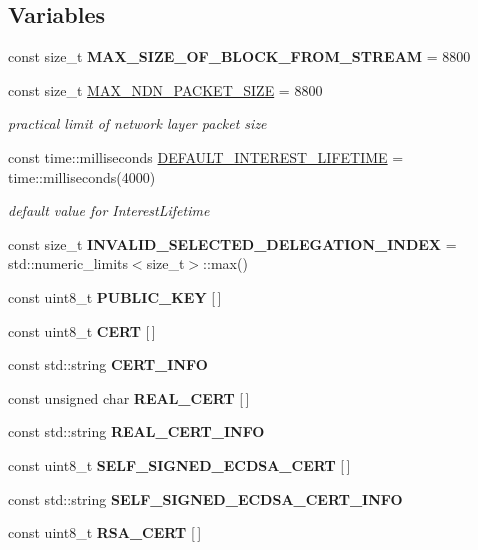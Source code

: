 \subsection*{Variables}
\begin{DoxyCompactItemize}
\item 
const size\+\_\+t {\bfseries M\+A\+X\+\_\+\+S\+I\+Z\+E\+\_\+\+O\+F\+\_\+\+B\+L\+O\+C\+K\+\_\+\+F\+R\+O\+M\+\_\+\+S\+T\+R\+E\+AM} = 8800\hypertarget{namespacendn_ab6b7f4ecd7d3cf13b51aa463d3fa7fb7}{}\label{namespacendn_ab6b7f4ecd7d3cf13b51aa463d3fa7fb7}

\item 
const size\+\_\+t \hyperlink{namespacendn_a8117ecf631e92bab09eb41b92ac9b2b6}{M\+A\+X\+\_\+\+N\+D\+N\+\_\+\+P\+A\+C\+K\+E\+T\+\_\+\+S\+I\+ZE} = 8800
\begin{DoxyCompactList}\small\item\em practical limit of network layer packet size \end{DoxyCompactList}\item 
const time\+::milliseconds \hyperlink{namespacendn_a63b98a0033d4c0cf18297688044a0258}{D\+E\+F\+A\+U\+L\+T\+\_\+\+I\+N\+T\+E\+R\+E\+S\+T\+\_\+\+L\+I\+F\+E\+T\+I\+ME} = time\+::milliseconds(4000)\hypertarget{namespacendn_a63b98a0033d4c0cf18297688044a0258}{}\label{namespacendn_a63b98a0033d4c0cf18297688044a0258}

\begin{DoxyCompactList}\small\item\em default value for Interest\+Lifetime \end{DoxyCompactList}\item 
const size\+\_\+t {\bfseries I\+N\+V\+A\+L\+I\+D\+\_\+\+S\+E\+L\+E\+C\+T\+E\+D\+\_\+\+D\+E\+L\+E\+G\+A\+T\+I\+O\+N\+\_\+\+I\+N\+D\+EX} = std\+::numeric\+\_\+limits$<$size\+\_\+t$>$\+::max()\hypertarget{namespacendn_a32e44e9d29558eb900f8e4cddfe70793}{}\label{namespacendn_a32e44e9d29558eb900f8e4cddfe70793}

\item 
const uint8\+\_\+t {\bfseries P\+U\+B\+L\+I\+C\+\_\+\+K\+EY} \mbox{[}$\,$\mbox{]}
\item 
const uint8\+\_\+t {\bfseries C\+E\+RT} \mbox{[}$\,$\mbox{]}
\item 
const std\+::string {\bfseries C\+E\+R\+T\+\_\+\+I\+N\+FO}
\item 
const unsigned char {\bfseries R\+E\+A\+L\+\_\+\+C\+E\+RT} \mbox{[}$\,$\mbox{]}
\item 
const std\+::string {\bfseries R\+E\+A\+L\+\_\+\+C\+E\+R\+T\+\_\+\+I\+N\+FO}
\item 
const uint8\+\_\+t {\bfseries S\+E\+L\+F\+\_\+\+S\+I\+G\+N\+E\+D\+\_\+\+E\+C\+D\+S\+A\+\_\+\+C\+E\+RT} \mbox{[}$\,$\mbox{]}
\item 
const std\+::string {\bfseries S\+E\+L\+F\+\_\+\+S\+I\+G\+N\+E\+D\+\_\+\+E\+C\+D\+S\+A\+\_\+\+C\+E\+R\+T\+\_\+\+I\+N\+FO}
\item 
const uint8\+\_\+t {\bfseries R\+S\+A\+\_\+\+C\+E\+RT} \mbox{[}$\,$\mbox{]}\hypertarget{namespacendn_a16e27891b814108278c88602d1ce9ad4}{}\label{namespacendn_a16e27891b814108278c88602d1ce9ad4}


\end{DoxyCompactItemize}
